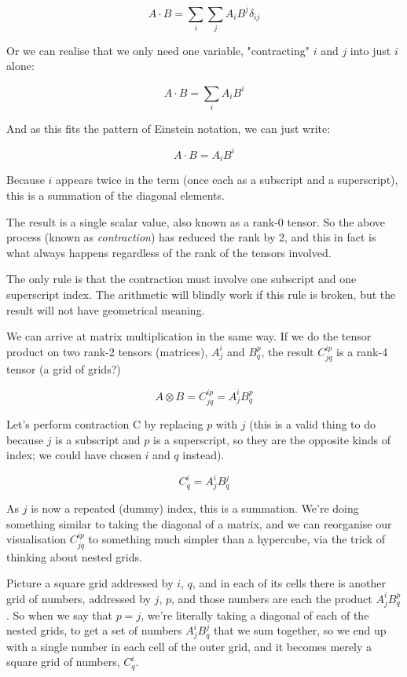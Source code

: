 $$A \cdot B = \sum_i\sum_j{A_iB^j\delta_{ij}}$$

Or we can realise that we only need one variable, "contracting" $i$ and $j$ into just $i$ alone:

$$A \cdot B = \sum_i{A_iB^i}$$

And as this fits the pattern of Einstein notation, we can just write:

$$A \cdot B = A_iB^i$$

Because $i$ appears twice in the term (once each as a subscript and a superscript), this is a summation of the diagonal elements.

The result is a single scalar value, also known as a rank-0 tensor. So the above process (known as \textit{contraction}) has reduced the rank by 2, and this in fact is what always happens regardless of the rank of the tensors involved.

The only rule is that the contraction must involve one subscript and one superscript index. The arithmetic will blindly work if this rule is broken, but the result will not have geometrical meaning.

We can arrive at matrix multiplication in the same way. If we do the tensor product on two rank-2 tensors (matrices), $A^i_j$ and $B^p_q$, the result $C^{ip}_{jq}$ is a rank-4 tensor (a grid of grids?)

$$A \otimes B = C^{ip}_{jq} = A^i_jB^p_q$$

Let's perform contraction C by replacing $p$ with $j$ (this is a valid thing to do because $j$ is a subscript and $p$ is a superscript, so they are the opposite kinds of index; we could have chosen $i$ and $q$ instead).

$$C^i_q = A^i_jB^j_q$$

As $j$ is now a repeated (dummy) index, this is a summation. We're doing something similar to taking the diagonal of a matrix, and we can reorganise our visualisation $C^{ip}_{jq}$ to something much simpler than a hypercube, via the trick of thinking about nested grids.

Picture a square grid addressed by $i$, $q$, and in each of its cells there is another grid of numbers, addressed by $j$, $p$, and those numbers are each the product $A^i_jB^p_q$. So when we say that $p = j$, we're literally taking a diagonal of each of the nested grids, to get a set of numbers $A^i_jB^j_q$ that we sum together, so we end up with a single number in each cell of the outer grid, and it becomes merely a square grid of numbers, $C^i_q$.

